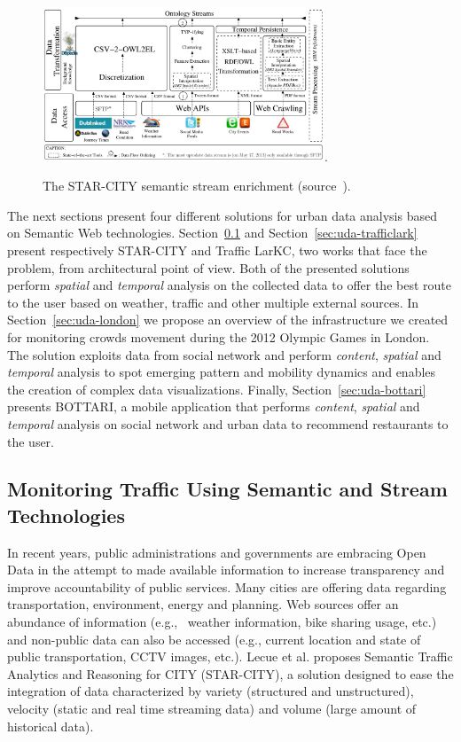 \begin{figure}[t!]
	\centering
	\includegraphics[width=0.75\textwidth]{img/starcity}.
    \caption{The STAR-CITY semantic stream enrichment (source~\cite{DBLP:journals/ws/LecueTHTBST14}).}
    \label{fig:star-city}
\end{figure}

The next sections present four different solutions for urban data analysis based on Semantic Web technologies.
Section~\ref{sec:uda-starcity} and Section~\ref{sec:uda-trafficlark} present respectively STAR-CITY and Traffic LarKC, two works that face the problem, from architectural point of view. Both of the presented solutions perform \textit{spatial} and \textit{temporal} analysis on the collected data to offer the best route to the user based on weather, traffic and other multiple external sources.
In Section~\ref{sec:uda-london} we propose an overview of the infrastructure we created for monitoring crowds movement during the 2012 Olympic Games in London. The solution exploits data from social network and perform \textit{content}, \textit{spatial} and \textit{temporal} analysis to spot emerging pattern and mobility dynamics and enables the creation of complex data visualizations.
Finally, Section~\ref{sec:uda-bottari} presents BOTTARI, a mobile application that performs \textit{content}, \textit{spatial} and \textit{temporal} analysis on social network and urban data to recommend restaurants to the user.

\subsection{Monitoring Traffic Using Semantic and Stream Technologies} \label{sec:uda-starcity}

In recent years, public administrations and governments are embracing Open Data in the attempt to made available information to increase transparency and improve accountability of public services. Many cities are offering data regarding transportation, environment, energy and planning. Web sources offer an abundance of information (e.g., ~weather information, bike sharing usage, etc.) and non-public data can also be accessed (e.g., current location and state of public transportation, CCTV images, etc.).
Lecue et al.\cite{DBLP:journals/ws/LecueTHTBST14} proposes Semantic Traffic Analytics and Reasoning for CITY (STAR-CITY), a solution designed to ease the integration of data characterized by variety (structured and unstructured), velocity (static and real time streaming data) and volume (large amount of historical data).

